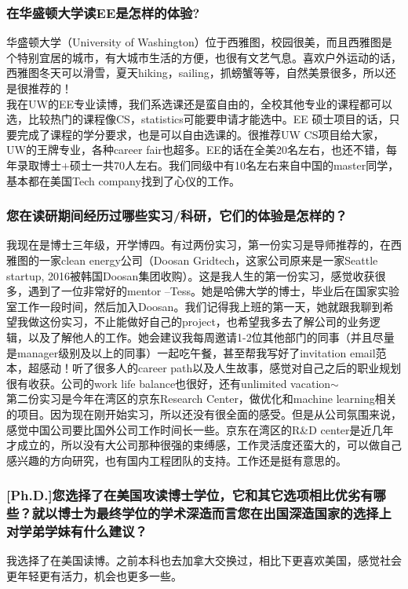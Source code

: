 \documentclass[a4paper,UTF8]{book}
\begin{document}
    \subsubsection*{在华盛顿大学读EE是怎样的体验?}
    华盛顿大学（University of Washington）位于西雅图，校园很美，而且西雅图是个特别宜居的城市，有大城市生活的方便，也很有文艺气息。喜欢户外运动的话，西雅图冬天可以滑雪，夏天hiking，sailing，抓螃蟹等等，自然美景很多，所以还是很推荐的！\\
    我在UW的EE专业读博，我们系选课还是蛮自由的，全校其他专业的课程都可以选，比较热门的课程像CS，statistics可能要申请才能选中。EE 硕士项目的话，只要完成了课程的学分要求，也是可以自由选课的。很推荐UW CS项目给大家，UW的王牌专业，各种career fair也超多。EE的话在全美20名左右，也还不错，每年录取博士+硕士一共70人左右。我们同级中有10名左右来自中国的master同学，基本都在美国Tech company找到了心仪的工作。

    \subsubsection*{您在读研期间经历过哪些实习/科研，它们的体验是怎样的？}
    我现在是博士三年级，开学博四。有过两份实习，第一份实习是导师推荐的，在西雅图的一家clean energy公司（Doosan Gridtech，这家公司原来是一家Seattle startup, 2016被韩国Doosan集团收购）。这是我人生的第一份实习，感觉收获很多，遇到了一位非常好的mentor --Tess。她是哈佛大学的博士，毕业后在国家实验室工作一段时间，然后加入Doosan。我们记得我上班的第一天，她就跟我聊到希望我做这份实习，不止能做好自己的project，也希望我多去了解公司的业务逻辑，以及了解他人的工作。她会建议我每周邀请1-2位其他部门的同事（并且尽量是manager级别及以上的同事）一起吃午餐，甚至帮我写好了invitation email范本，超感动！听了很多人的career path以及人生故事，感觉对自己之后的职业规划很有收获。公司的work life balance也很好，还有unlimited vacation$\sim$\\
    第二份实习是今年在湾区的京东Research Center，做优化和machine learning相关的项目。因为现在刚开始实习，所以还没有很全面的感受。但是从公司氛围来说，感觉中国公司要比国外公司工作时间长一些。京东在湾区的R\&D center是近几年才成立的，所以没有大公司那种很强的束缚感，工作灵活度还蛮大的，可以做自己感兴趣的方向研究，也有国内工程团队的支持。工作还是挺有意思的。

    \subsubsection*{[Ph.D.]您选择了在美国攻读博士学位，它和其它选项相比优劣有哪些？就以博士为最终学位的学术深造而言您在出国深造国家的选择上对学弟学妹有什么建议？}
    我选择了在美国读博。之前本科也去加拿大交换过，相比下更喜欢美国，感觉社会更年轻更有活力，机会也更多一些。
\end{document}

